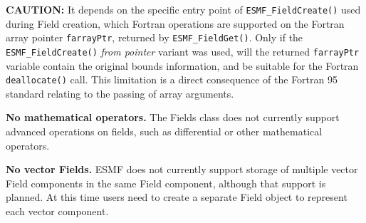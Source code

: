 

\begin{enumerate}
\label{Field:rest}

\begin{sloppypar}
\item {\bf CAUTION:} It depends on the specific entry point of {\tt ESMF\_FieldCreate()} used during Field creation, which Fortran operations are supported on the Fortran array pointer {\tt farrayPtr}, returned by {\tt ESMF\_FieldGet()}. Only if the {\tt ESMF\_FieldCreate()} {\em from pointer} variant was used, will the returned {\tt farrayPtr} variable contain the original bounds information, and be suitable for the Fortran {\tt deallocate()} call. This limitation is a direct consequence of the Fortran 95 standard relating to the passing of array arguments.
\end{sloppypar}

\item {\bf No mathematical operators.}  The Fields class does not 
currently support advanced
operations on fields, such as differential or other
mathematical operators.

\item {\bf No vector Fields.}  ESMF does not currently  support storage of 
multiple vector Field components in the same Field component, although
that support is planned.  At this time users need to create a 
separate Field object to represent each vector component.

\end{enumerate}

